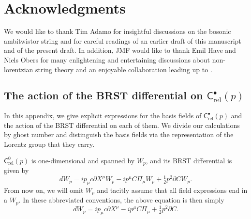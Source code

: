\documentclass[11pt,reqno,a4paper,final]{amsart}
\theoremstyle{plain}
\theoremstyle{definition}
\renewcommand{\d}{\partial}
\newcommand{\Crel}{\mathsf{C}_{\mathrm{rel}}} %
\newcommand{\1}{\mathbb{1}}
\numberwithin{equation}{section}
\begin{document}
\section*{Acknowledgments}

We would like to thank Tim Adamo for insightful discussions on the bosonic 
ambitwistor string and for careful readings of an earlier draft of
this manuscript and of the present draft.  In addition, JMF would like
to thank Emil Have and Niels Obers for many enlightening and
entertaining discussions about non-lorentzian string theory and an
enjoyable collaboration leading up to \cite{Figueroa-OFarrill:2025njv}.

\begin{appendices}
\section{The action of the BRST differential on $\Crel^\bullet(p)$}
\label{app:calculation of d on Crel}
In this appendix, we give explicit expressions for the basis fields of $\Crel^\bullet(p)$ and the action of the BRST differential on each of them. We divide our calculations by ghost number and distinguish the basis fields via the representation of the Lorentz group that they carry.

$\Crel^0(p)$ is one-dimensional and spanned by $W_p$, and its BRST differential is
given by
\begin{equation}
  dW_p = i p_\mu c \d X^\mu W_p - i p^\mu C \Pi_\mu W_p + \tfrac12 p^2 \d C W_p.
\end{equation}
From now on, we will omit $W_p$ and tacitly assume that all field expressions
end in a $W_p$.  In these abbreviated conventions, the above equation
is then simply
\begin{equation}
  \label{eq:dvac}
  dW_p = i p_\mu c \d X^\mu - i p^\mu C \Pi_\mu + \tfrac12 p^2 \d C.
\end{equation}



\end{appendices}
\end{document}
